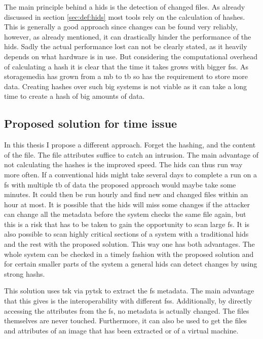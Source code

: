 \documentclass[
	a4paper,					%
	10pt,							%
	twoside,					%
	openright,				%
	notitlepage,			%
	parskip=half,			%
]{scrreprt}					%
\begin{document}
The main principle behind a \gls{hids} is the detection of changed files. As already discussed in section \ref{sec:def:hids} most tools rely on the calculation of hashes. This is generally a good approach since changes can be found very reliably, however, as already mentioned, it can drastically hinder the performance of the \gls{hids}. Sadly the actual performance lost can not be clearly stated, as it heavily depends on what hardware is in use. But considering the computational overhead of calculating a \gls{hash} it is clear that the time it takes grows with bigger \glspl{fs}. As \gls{storagemedia} has grown from a \gls{mb} to \gls{tb} so has the requirement to store more data. Creating hashes over such big systems is not viable as it can take a long time to create a hash of big amounts of data. \cite{hash:slow, hash:veryslow, hash:speed}

\subsection{Proposed solution for time issue}

In this thesis I propose a different approach. Forget the hashing, and the content of the file. The file attributes suffice to catch an intrusion. The main advantage of not calculating the hashes is the improved speed. The \gls{hids} can thus run way more often. If a conventional \gls{hids} might take several days to complete a run on a \gls{fs} with multiple \gls{tb} of data the proposed approach would maybe take some minutes. It could then be run hourly and find new and changed files within an hour at most. It is possible that the \gls{hids} will miss some changes if the attacker can change all the \gls{metadata} before the system checks the same file again, but this is a risk that has to be taken to gain the opportunity to scan large \gls{fs}. It is also possible to scan highly critical sections of a system with a traditional \gls{hids} and the rest with the proposed solution. This way one has both advantages. The whole system can be checked in a timely fashion with the proposed solution and for certain smaller parts of the system a general \gls{hids} can detect changes by using strong \glspl{hash}.

This solution uses \gls{tsk} via \gls{pytsk} to extract the \gls{fs} \gls{metadata}. The main advantage that this gives is the interoperability with different \glspl{fs}. Additionally, by directly accessing the attributes from the \gls{fs}, no \gls{metadata} is actually changed. The files themselves are never touched. Furthermore, it can also be used to get the files and attributes of an image that has been extracted or of a virtual machine. 
\end{document}
